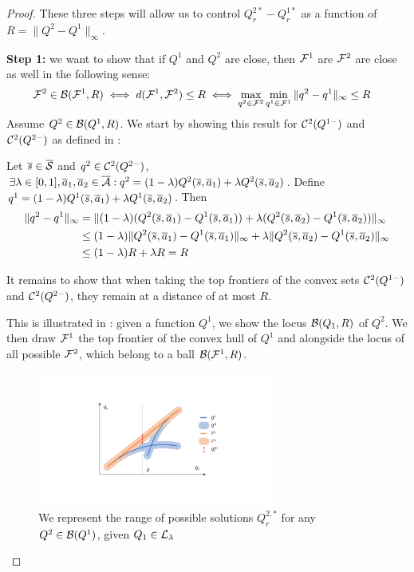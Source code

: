 \begin{proof}
These three steps will allow us to control $Q_r^{2*} - Q_r^{1*}$ as a function of $R = \|Q^2-Q^1\|_\infty$.

\textbf{Step 1:} we want to show that if $Q^1$ and $Q^2$ are close, then $\mathcal{F}^1$ are $\mathcal{F}^2$ are close as well in the following sense:
\begin{align}
    \mathcal{F}^2\in\mathcal{B}(\mathcal{F}^1, R) &\iff d(\mathcal{F}^1, \mathcal{F}^2) \leq R \iff \max_{q^2\in\mathcal{F}^2}\min_{q^1\in\mathcal{F}^1}\|q^2-q^1\|_\infty \leq R
    \label{eq:ball-set}
\end{align}
Assume $Q^2\in\mathcal{B}(Q^1,R)$.
We start by showing this result for $\mathcal{C}^2(Q^{1-})$ and $\mathcal{C}^2(Q^{2-})$ as defined in :

Let $\overline{s}\in\overline{\mathcal{S}}$ and $q^2\in\mathcal{C}^2(Q^{2-})$, $\exists\lambda\in[0,1], \overline{a}_1,\overline{a}_2\in\overline{\mathcal{A}}: q^2 = (1-\lambda)Q^2(\overline{s},\overline{a}_1) + \lambda Q^2(\overline{s},\overline{a}_2)$. Define $q^1 = (1-\lambda)Q^1(\overline{s},\overline{a}_1) + \lambda Q^1(\overline{s},\overline{a}_2)$. Then 
\begin{align*}
    \|q^2-q^1\|_\infty &= \|(1-\lambda)(Q^2(\overline{s},\overline{a}_1) - Q^1(\overline{s},\overline{a}_1)) + \lambda (Q^2(\overline{s},\overline{a}_2) - Q^1(\overline{s},\overline{a}_2))\|_\infty\\
    &\leq  (1-\lambda)\|Q^2(\overline{s},\overline{a}_1) - Q^1(\overline{s},\overline{a}_1)\|_\infty + \lambda \|Q^2(\overline{s},\overline{a}_2) - Q^1(\overline{s},\overline{a}_2)\|_\infty\\
    &\leq (1-\lambda)R+\lambda R = R
\end{align*}

It remains to show that when taking the top frontiers of the convex sets $\mathcal{C}^2(Q^{1-})$ and $\mathcal{C}^2(Q^{2-})$, they remain at a distance of at most $R$.

This is illustrated in : given a function $Q^1$, we show the locus $\mathcal{B}(Q_1,R)$ of $Q^2$. We then draw $\mathcal{F}^1$ the top frontier of the convex hull of $Q^1$ and alongside the locus of all possible $\mathcal{F}^2$, which belong to a ball $\mathcal{B}(\mathcal{F}^1, R)$. 

\begin{figure}[ht]
    \centering
    \includegraphics[trim=7cm 4cm 7cm 4cm, clip, width=0.7\textwidth]{source/img/contraction_lipschitz.pdf}
    \caption{We represent the range of possible solutions $Q_r^{2,*}$ for any $Q^2\in\mathcal{B}(Q^1)$, given $Q_1\in\mathcal{L}_\lambda$}
    \label{fig:contraction_lips_hull}
\end{figure}


\end{proof}
